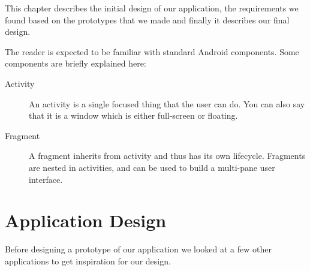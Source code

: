This chapter describes the initial design of our application,  the requirements we found based on the prototypes that we made and finally it describes our final design.

The reader is expected to be familiar with standard Android components. Some components are briefly explained here:
\begin{description}
\item[Activity] An activity is a single focused thing that the user can do. You can also say that it is a window which is either full-screen or floating. \citep{activity}
\item[Fragment] A fragment inherits from activity and thus has its own lifecycle. Fragments are nested in activities, and can be used to build a multi-pane user interface. \citep{fragment}
\end{description}

\section{Application Design}\label{sec:appdesign}

Before designing a prototype of our application we looked at a few other applications to get inspiration for our design.

